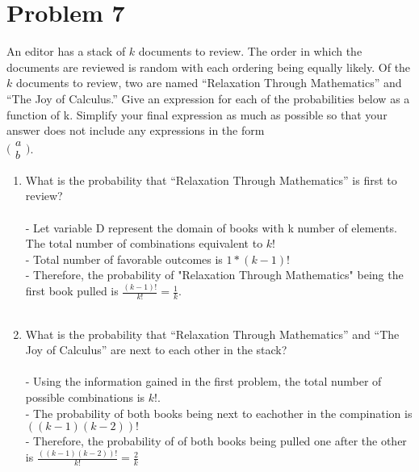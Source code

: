\documentclass{amsart}
\theoremstyle{definition}
\theoremstyle{Exercise}
\theoremstyle{remark}
\theoremstyle{rule}
\numberwithin{equation}{section}
\begin{document}
 \newpage
\vspace*{0.1in}
\section*{Problem 7}
An editor has a stack of $k$ documents to review.  The order in which the documents are reviewed is random with each ordering being equally likely. Of the $k$ documents to review, two are named ``Relaxation Through Mathematics'' and ``The Joy of Calculus.'' Give an expression for each of the probabilities below as a function of k. Simplify your final expression as much as possible so that your answer does not include any expressions in the form\\
$
\Big(
 \begin{array}{c}
 a\\
 b
    \end{array}
    \Big)
$.
 \begin{enumerate}[label=(\alph*)]
\item What is the probability that ``Relaxation Through Mathematics'' is first to review?\\\\
  - Let variable D represent the domain of books with k number of elements. The total number of combinations equivalent to $k!$\\
  - Total number of favorable outcomes is $1*(k-1)!$\\
  - Therefore, the probability of "Relaxation Through Mathematics" being the first book pulled is $\frac{(k-1)!}{k!} = \frac{1}{k}$.
\\\\
\item What is the probability that ``Relaxation Through Mathematics'' and ``The Joy of Calculus'' are next to each other in the stack?\\\\
  - Using the information gained in the first problem, the total number of possible combinations is $k!$.\\
  - The probability of both books being next to eachother in the compination is $((k-1)(k-2))!$\\
  - Therefore, the probability of of both books being pulled one after the other is $\frac{((k-1)(k-2))!}{k!} = \frac{2}{k}$
\\\\
\end{enumerate}
\end{document}
